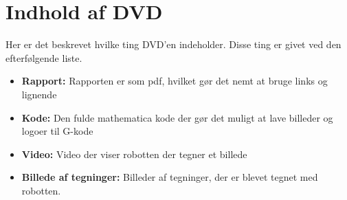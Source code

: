 \section{Indhold af DVD}
Her er det beskrevet hvilke ting DVD'en indeholder. Disse ting er givet ved den efterfølgende liste.

\begin{itemize}
\item \textbf{Rapport:} Rapporten er som pdf, hvilket gør det nemt at bruge links og lignende
\item \textbf{Kode:} Den fulde mathematica kode der gør det muligt at lave billeder og logoer til G-kode
\item \textbf{Video:} Video der viser robotten der tegner et billede
\item \textbf{Billede af tegninger:} Billeder af tegninger, der er blevet tegnet med robotten. 
\end{itemize}